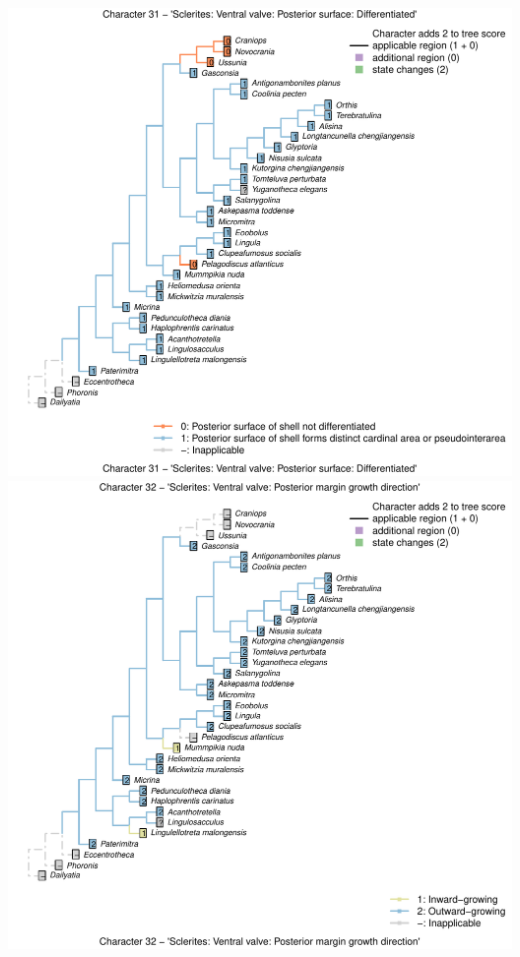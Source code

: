 \documentclass[]{book}
\theoremstyle{definition}
\theoremstyle{definition}
\theoremstyle{definition}
\theoremstyle{remark}
\begin{document}
\includegraphics{Brachiopod_phylogeny_files/figure-latex/unnamed-chunk-4-31.pdf}
\includegraphics{Brachiopod_phylogeny_files/figure-latex/unnamed-chunk-4-32.pdf}
\end{document}
